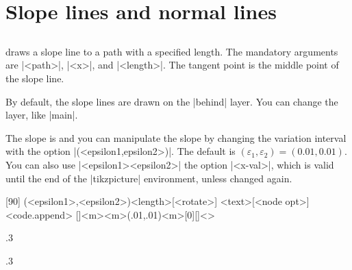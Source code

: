 \section{Slope lines and normal lines}
\label{s:slopes}

\subsection{\protect\cmd{\tzslopeat}}
\label{ss:tzslopeat}

\icmd{\tzslopeat} draws a slope line to a path with a specified length.
The mandatory arguments are |{<path>}|, |{<x>}|, and |{<length>}|.
The tangent point is the middle point of the slope line.

By default, the slope lines are drawn on the |behind| layer.
You can change the layer, like \icmd{\settztslopelayer}|{main}|.

\remark The slope is  and you can manipulate the slope by changing the variation interval with the option |(<epsilon1,epsilon2>)|. The default is $(\varepsilon_1,\varepsilon_2)=(0.01,0.01)$.
You can also use
\icmd{\tzslopeepsilon}|{<epsilon1>}{<epsilon2>}|  the option |{<x-val>}|, which is valid until the end of the |tikzpicture| environment, unless changed again.


\begin{tzdef}{}
[90]  %
(<epsilon1>,<epsilon2>){<length>}[<rotate>]
          {<text>}[<node opt>]<code.append>
  []{<m>}{<m>}(.01,.01){<m>}[0]{}[]<>
\end{tzdef}

\begin{tzcode}{.3}
{}
\end{tzcode}


\begin{tzcode}{.3}
\end{tzcode}




